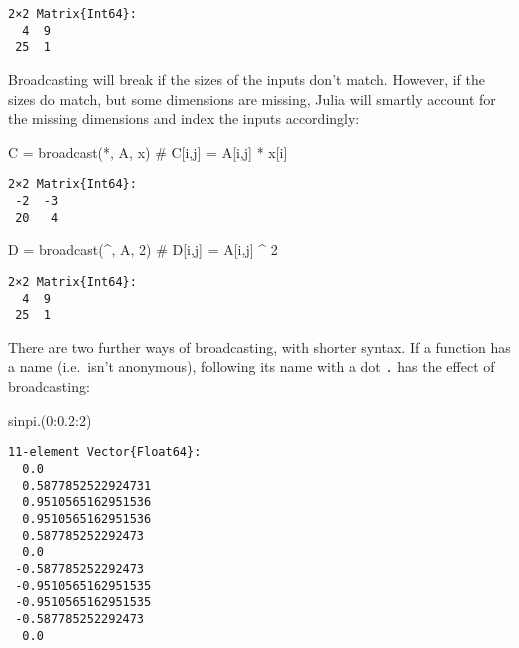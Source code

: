 \documentclass[
  letterpaper,
  DIV=11,
  numbers=noendperiod]{scrreprt}
\newenvironment{Shaded}{\begin{snugshade}}{\end{snugshade}}
\newcommand{\CommentTok}[1]{\textcolor[rgb]{0.37,0.37,0.37}{#1}}
\newcommand{\FloatTok}[1]{\textcolor[rgb]{0.68,0.00,0.00}{#1}}
\newcommand{\FunctionTok}[1]{\textcolor[rgb]{0.28,0.35,0.67}{#1}}
\newcommand{\NormalTok}[1]{\textcolor[rgb]{0.00,0.23,0.31}{#1}}
\newcommand{\OperatorTok}[1]{\textcolor[rgb]{0.37,0.37,0.37}{#1}}
\begin{document}
\begin{verbatim}
2×2 Matrix{Int64}:
  4  9
 25  1
\end{verbatim}

Broadcasting will break if the sizes of the inputs don't match. However,
if the sizes do match, but some dimensions are missing, Julia will
smartly account for the missing dimensions and index the inputs
accordingly:

\begin{Shaded}
\begin{Highlighting}[]
\NormalTok{C }\OperatorTok{=} \FunctionTok{broadcast}\NormalTok{(}\OperatorTok{*}\NormalTok{, A, x) }\CommentTok{\# C[i,j] = A[i,j] * x[i]}
\end{Highlighting}
\end{Shaded}

\begin{verbatim}
2×2 Matrix{Int64}:
 -2  -3
 20   4
\end{verbatim}

\begin{Shaded}
\begin{Highlighting}[]
\NormalTok{D }\OperatorTok{=} \FunctionTok{broadcast}\NormalTok{(}\OperatorTok{\^{}}\NormalTok{, A, }\FloatTok{2}\NormalTok{) }\CommentTok{\# D[i,j] = A[i,j] \^{} 2}
\end{Highlighting}
\end{Shaded}

\begin{verbatim}
2×2 Matrix{Int64}:
  4  9
 25  1
\end{verbatim}

There are two further ways of broadcasting, with shorter syntax. If a
function has a name (i.e.~isn't anonymous), following its name with a
dot \texttt{.} has the effect of broadcasting:

\begin{Shaded}
\begin{Highlighting}[]
\FunctionTok{sinpi}\NormalTok{.(}\FloatTok{0}\OperatorTok{:}\FloatTok{0.2}\OperatorTok{:}\FloatTok{2}\NormalTok{)}
\end{Highlighting}
\end{Shaded}

\begin{verbatim}
11-element Vector{Float64}:
  0.0
  0.5877852522924731
  0.9510565162951536
  0.9510565162951536
  0.587785252292473
  0.0
 -0.587785252292473
 -0.9510565162951535
 -0.9510565162951535
 -0.587785252292473
  0.0
\end{verbatim}
\end{document}
